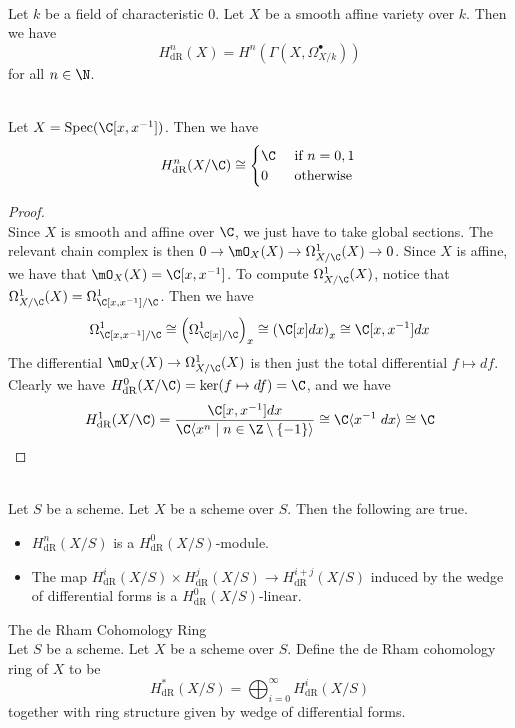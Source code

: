 \documentclass[a4paper]{article}
\begin{document}
\begin{lmm}{}{}\\
Let $k$ be a field of characteristic $0$. Let $X$ be a smooth affine variety over $k$. Then we have $$H_\text{dR}^n(X)=H^n(\Gamma(X,\Omega_{X/k}^\bullet))$$ for all $n\in\N$. 
\end{lmm}

\begin{eg}{}{}\\
Let $X=\text{Spec}(\C[x,x^{-1}])$. Then we have $$H_\text{dR}^n(X/\C)\cong\begin{cases}
\C & \text{ if }n=0,1\\
0 & \text{ otherwise }
\end{cases}$$
\begin{proof}\\
Since $X$ is smooth and affine over $\C$, we just have to take global sections. The relevant chain complex is then $0\to\mO_X(X)\to\Omega_{X/\C}^1(X)\to 0$. Since $X$ is affine, we have that $\mO_X(X)=\C[x,x^{-1}]$. To compute $\Omega_{X/\C}^1(X)$, notice that $\Omega_{X/\C}^1(X)=\Omega_{\C[x,x^{-1}]/\C}^1$. Then we have $$\Omega_{\C[x,x^{-1}]/\C}^1\cong\left(\Omega_{\C[x]/\C}^1\right)_x\cong\left(\C[x]dx\right)_x\cong\C[x,x^{-1}]dx$$ The differential $\mO_X(X)\to\Omega_{X/\C}^1(X)$ is then just the total differential $f\mapsto df$. Clearly we have $H_\text{dR}^0(X/\C)=\ker(f\mapsto df)=\C$, and we have $$H_\text{dR}^1(X/\C)=\frac{\C[x,x^{-1}]dx}{\C\langle x^n\;|\;n\in\Z\setminus\{-1\}\rangle}\cong\C\langle x^{-1}\;dx\rangle\cong\C$$
\end{proof}
\end{eg}

\begin{prp}{}{}\\
Let $S$ be a scheme. Let $X$ be a scheme over $S$. Then the following are true. 
\begin{itemize}
\item $H_\text{dR}^n(X/S)$ is a $H_\text{dR}^0(X/S)$-module. 
\item The map $H_\text{dR}^i(X/S)\times H_\text{dR}^j(X/S)\to H_\text{dR}^{i+j}(X/S)$ induced by the wedge of differential forms is a $H_\text{dR}^0(X/S)$-linear. 
\end{itemize}
\end{prp}

\begin{defn}{The de Rham Cohomology Ring}{}\\
Let $S$ be a scheme. Let $X$ be a scheme over $S$. Define the de Rham cohomology ring of $X$ to be $$H_\text{dR}^\ast(X/S)=\bigoplus_{i=0}^\infty H_\text{dR}^i(X/S)$$ together with ring structure given by wedge of differential forms. 
\end{defn}
\end{document}
